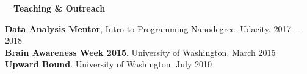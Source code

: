 \documentclass[a4paper,12pt]{article}
\newcommand{\resheading}[1]{{\hspace{-9pt} \colorbox{mygrey}{\begin{minipage}{\textwidth}{\textmd{~~\large \textbf{#1} \vphantom{p\^{E}}}}\end{minipage}}\vspace{6pt}} }
\begin{document}
\resheading{Teaching \& Outreach}


\textbf{Data Analysis Mentor}, Intro to Programming Nanodegree. Udacity. \hfill 2017 --- 2018\\

        \textbf{Brain Awareness Week 2015}. University of Washington. \hfill  March 2015\\

        \textbf{Upward Bound}. University of Washington. \hfill  July 2010\\
        



        
\end{document}
